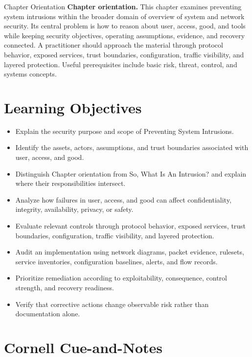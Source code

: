 \documentclass[11pt,letterpaper]{article}
\title{\CornellDocumentTitle}
\author{}
\date{}
\begin{document}
\maketitle
\begin{CornellOverviewBox}{Chapter Orientation}
\textbf{Chapter orientation.} This chapter examines preventing system intrusions within the broader domain of overview of system and network security. Its central problem is how to reason about user, access, good, and tools while keeping security objectives, operating assumptions, evidence, and recovery connected. A practitioner should approach the material through protocol behavior, exposed services, trust boundaries, configuration, traffic visibility, and layered protection. Useful prerequisites include basic risk, threat, control, and systems concepts.
\end{CornellOverviewBox}
\section*{Learning Objectives}
\begin{itemize}
\item Explain the security purpose and scope of Preventing System Intrusions.
\item Identify the assets, actors, assumptions, and trust boundaries associated with user, access, and good.
\item Distinguish Chapter orientation from So, What Is An Intrusion? and explain where their responsibilities intersect.
\item Analyze how failures in user, access, and good can affect confidentiality, integrity, availability, privacy, or safety.
\item Evaluate relevant controls through protocol behavior, exposed services, trust boundaries, configuration, traffic visibility, and layered protection.
\item Audit an implementation using network diagrams, packet evidence, rulesets, service inventories, configuration baselines, alerts, and flow records.
\item Prioritize remediation according to exploitability, consequence, control strength, and recovery readiness.
\item Verify that corrective actions change observable risk rather than documentation alone.
\end{itemize}
\section*{Cornell Cue-and-Notes}
\end{document}

